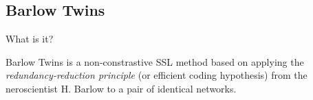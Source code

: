 \documentclass[../../thesis.tex]{subfiles}
\begin{document}






\subsection{Barlow Twins}
What is it?

Barlow Twins is a non-constrastive SSL method based on applying the \textit{redundancy-reduction principle} (or efficient coding hypothesis) \cite{Barlow_origin} from the neroscientist H. Barlow to a pair of identical networks. 
\end{document}

